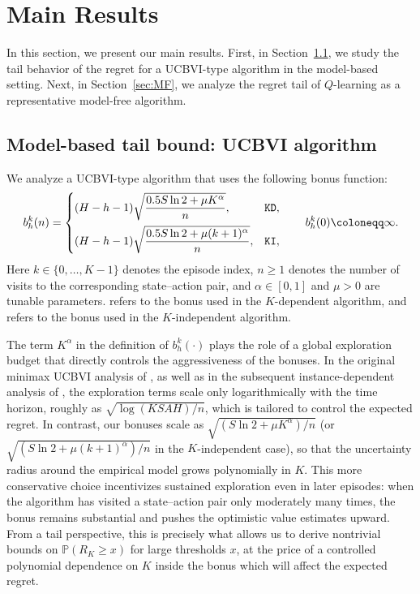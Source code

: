 \documentclass[11pt]{article}
\newcommand{\PP}{\mathbb{P}}
\newcommand{\KD} {\texttt{KD}}
\newcommand{\KI} {\texttt{KI}}
\begin{document}
\section{Main Results}
In this section, we present our main results. First, in Section~\ref{sec:MB}, we study the tail behavior of the regret for a UCBVI-type algorithm in the model-based setting. Next, in Section~\ref{sec:MF}, we analyze the regret tail of $Q$-learning as a representative model-free algorithm.

\subsection{Model-based tail bound: UCBVI algorithm} \label{sec:MB}
We analyze a UCBVI-type algorithm that uses the following bonus function:
\[
b^k_h(n)
=
\begin{cases}
(H-h-1)\sqrt{\dfrac{0.5S\ln 2+\mu K^\alpha}{n}}, & \text{\KD},\\[2ex]
(H-h-1)\sqrt{\dfrac{0.5S\ln 2+\mu (k+1)^\alpha}{n}}, & \text{\KI},
\end{cases}
\qquad
b^k_h(0)\coloneqq\infty.
\]
Here $k\in\{0,\dots,K-1\}$ denotes the episode index, $n\ge 1$ denotes the number of visits to the corresponding state–action pair, and $\alpha\in[0,1]$ and $\mu>0$ are tunable parameters. \text{\KD} refers to the bonus used in the $K$-dependent algorithm, and \text{\KI} refers to the bonus used in the $K$-independent algorithm.



The term $K^\alpha$ in the definition of $b_h^k(\cdot)$ plays the role of a global exploration budget that directly controls the aggressiveness of the bonuses. In the original minimax UCBVI analysis of \citet{azar2017minimax}, as well as in the subsequent instance-dependent analysis of \citet{simchowitz2019non}, the exploration terms scale only logarithmically with the time horizon, roughly as $\sqrt{{\log(KSAH)}/{n}}$, which is tailored to control the expected regret. In contrast, our bonuses scale as $\sqrt{(S\ln 2 + \mu K^\alpha)/n}$ (or $\sqrt{(S\ln 2 + \mu (k+1)^\alpha)/n}$ in the $K$-independent case), so that the uncertainty radius around the empirical model grows polynomially in $K$. This more conservative choice incentivizes sustained exploration even in later episodes: when the algorithm has visited a state--action pair only moderately many times, the bonus remains substantial and pushes the optimistic value estimates upward. From a tail perspective, this is precisely what allows us to derive nontrivial bounds on $\PP(R_K \ge x)$ for large thresholds $x$, at the price of a controlled polynomial dependence on $K$ inside the bonus which will affect the expected regret.
\end{document}
